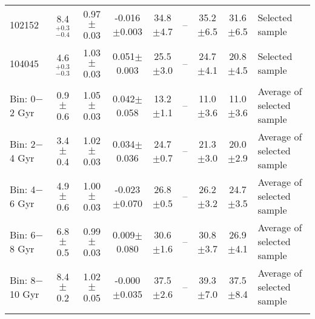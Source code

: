 \begin{table*}
\begin{tabular}{lcccccccl}
102152 &   8.4$_{-0.4}^{+0.3}$   &   0.97$\pm$0.03   &   -0.016$\pm$0.003   &   34.8$\pm$4.7   &   --   & 35.2$\pm$6.5 & 31.6$\pm$6.5 &   Selected sample \\ 
104045 &   4.6$_{-0.3}^{+0.3}$   &   1.03$\pm$0.03   &   0.051$\pm$0.003   &   25.5$\pm$3.0   &   --   & 24.7$\pm$4.1 & 20.8$\pm$4.5 &   Selected sample \\
\hline
Bin: 0$-$2 Gyr  &  0.9$\pm$0.6  &  1.05$\pm$0.03  &  0.042$\pm$0.058  &  13.2$\pm$1.1  &  --  &  11.0$\pm$3.6  &  11.0$\pm$3.6  &  Average of selected sample \\ 
Bin: 2$-$4 Gyr  &  3.4$\pm$0.4  &  1.02$\pm$0.03  &  0.034$\pm$0.036  &  24.7$\pm$0.7  &  --  &  21.3$\pm$3.0  &  20.0$\pm$2.9  &  Average of selected sample \\ 
Bin: 4$-$6 Gyr  &  4.9$\pm$0.6  &  1.00$\pm$0.03  &  -0.023$\pm$0.070  &  26.8$\pm$0.5  &  --  &  26.2$\pm$3.2  &  24.7$\pm$3.5  &  Average of selected sample \\ 
Bin: 6$-$8 Gyr  &  6.8$\pm$0.5  &  0.99$\pm$0.03  &  0.009$\pm$0.080  &  30.6$\pm$1.6  &  --  &  30.8$\pm$3.7  &  26.9$\pm$4.1  &  Average of selected sample \\ 
Bin: 8$-$10 Gyr  &  8.4$\pm$0.2  &  1.02$\pm$0.05  &  -0.000$\pm$0.035  &  37.5$\pm$2.6  &  --  &  39.3$\pm$7.0  & 37.5$\pm$8.4   &  Average of selected sample \\ 
\hline			
\label{tab:data}
\end{tabular}
\end{table*}

